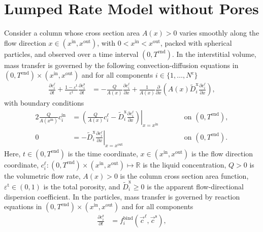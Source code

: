 \documentclass{article}
\begin{document}
\section*{Lumped Rate Model without Pores}
Consider a column whose cross section area $A(x) > 0$ varies smoothly along the flow direction $x \in (x^{\mathrm{in}}, x^{\mathrm{out}})$, with $0 < x^{\mathrm{in}} < x^{\mathrm{out}}$, packed with spherical particles, and observed over a time interval $(0, T^{\mathrm{end}})$.
In the interstitial volume, mass transfer is governed by the following convection-diffusion equations in $(0, T^{\mathrm{end}})\times (x^{\mathrm{in}}, x^{\mathrm{out}})$ and for all components $i\in\{1, \dots, N^{\mathrm{c}} \}$
\begin{align}
    \frac{\partial c^{\mathrm{\ell}}_{i}}{\partial t}
        + \frac{1 - \varepsilon^{\mathrm{t}}}{\varepsilon^{\mathrm{t}}} \frac{\partial c^{\mathrm{s}}_{i}}{\partial t}
    &= - \frac{Q}{A(x)} \frac{\partial c^{\mathrm{\ell}}_{i}}{\partial x}
        + \frac{1}{A(x)} \frac{\partial}{\partial x} \left( A(x) \tilde{D}^{\mathrm{x}}_{i} \frac{\partial c^{\mathrm{\ell}}_{i}}{\partial x} \right),
\end{align}
with boundary conditions
\begin{alignat}{2}
    \frac{Q}{A(x^{\mathrm{in}})} c^{\mathrm{in}}_{i}
    &= \left.\left( \frac{Q}{A(x)} c^{\mathrm{\ell}}_{i} - \tilde{D}^{\mathrm{x}}_{i} \frac{\partial c^{\mathrm{\ell}}_{i}}{\partial x}\right)\right|_{x=x^{\mathrm{in}}}
    & & \qquad\text{on }(0, T^{\mathrm{end}}),
    \\
    0
    &= - \tilde{D}^{\mathrm{x}}_{i} \left. \frac{\partial c^{\mathrm{\ell}}_{i}}{\partial x} \right|_{x=x^{\mathrm{out}}}
    & & \qquad\text{on }(0, T^{\mathrm{end}}).
\end{alignat}
Here, $t\in (0, T^{\mathrm{end}})$ is the time coordinate, $x\in (x^{\mathrm{in}}, x^{\mathrm{out}})$ is the flow direction coordinate, $c^{\mathrm{\ell}}_{i}\colon (0, T^{\mathrm{end}})\times (x^{\mathrm{in}}, x^{\mathrm{out}}) \mapsto \mathbb{R}$ is the liquid concentration, $Q> 0$ is the volumetric flow rate, $A(x) > 0$ is the column cross section area function, $\varepsilon^{\mathrm{t}}\in (0, 1)$ is the total porosity, and $\tilde{D}^{\mathrm{x}}_{i}\geq 0$ is the apparent flow-directional dispersion coefficient.
In the particles, mass transfer is governed by reaction equations in $(0, T^{\mathrm{end}}) \times (x^{\mathrm{in}}, x^{\mathrm{out}})$ and for all components
\begin{align}
    \frac{\partial c^{\mathrm{s}}_{i}}{\partial t}
    &= f^{\mathrm{bind}}_{i}\left( \vec{c}^{\mathrm{\ell}}, \vec{c}^{\mathrm{s}} \right),
\end{align}
\end{document}
